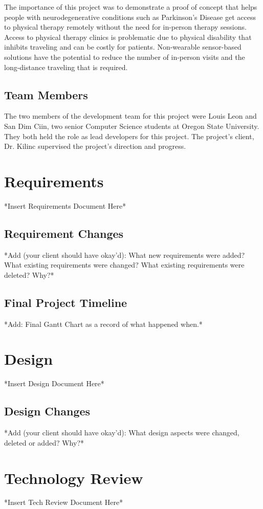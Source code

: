 \documentclass[onecolumn, draftclsnofoot,10pt, compsoc]{IEEEtran}
\begin{document}
The importance of this project was to demonstrate a proof of concept that helps people with neurodegenerative conditions such as Parkinson's Disease get access to physical therapy remotely without the need for in-person therapy sessions. Access to physical therapy clinics is problematic due to physical disability that inhibits traveling and can be costly for patients. Non-wearable sensor-based solutions have the potential to reduce the number of in-person visits and the long-distance traveling that is required. 

\subsection{Team Members}
The two members of the development team for this project were Louis Leon and San Dim Ciin, two senior Computer Science students at Oregon State University. They both held the role as lead developers for this project. The project's client, Dr. Kilinc supervised the project's direction and progress. 

\section{Requirements}
*Insert Requirements Document Here*
\subsection{Requirement Changes}
*Add (your client should have okay'd): What new requirements were added? What existing requirements were changed? What existing requirements were deleted? Why?* 
\subsection{Final Project Timeline}
*Add: Final Gantt Chart as a record of what happened when.* 


\section{Design}
*Insert Design Document Here*
\cite{KinectDevelop}
\subsection{Design Changes}
*Add (your client should have okay'd): What design aspects were changed, deleted or added? Why?*


\section{Technology Review}
*Insert Tech Review Document Here*
\end{document}
